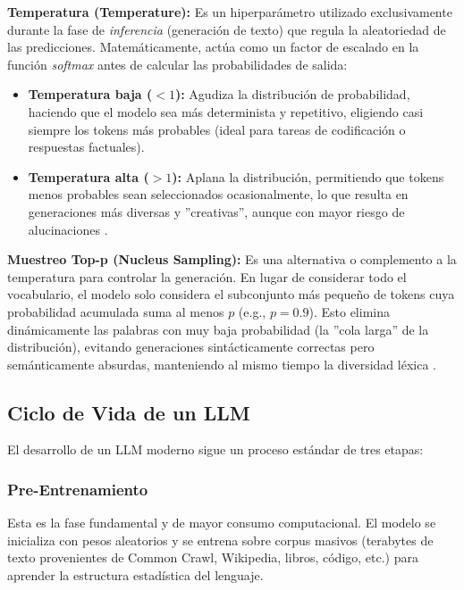 \documentclass[11pt, a4paper]{article}
\begin{document}
\begin{description}
    \item{\textbf{Temperatura (Temperature):}}
    Es un hiperparámetro utilizado exclusivamente durante la fase de \textit{inferencia} (generación de texto) que regula la aleatoriedad de las predicciones. Matemáticamente, actúa como un factor de escalado
    en la función \textit{softmax} antes de calcular las probabilidades de salida:
    \begin{itemize}
        \item \textbf{Temperatura baja ($< 1$):} Agudiza la distribución de probabilidad, haciendo que el modelo sea más determinista y repetitivo, eligiendo casi siempre los tokens más probables (ideal para
        tareas de codificación o respuestas factuales).
        \item \textbf{Temperatura alta ($> 1$):} Aplana la distribución, permitiendo que tokens menos probables sean seleccionados ocasionalmente, lo que resulta en generaciones más diversas y ''creativas'',
        aunque con mayor riesgo de alucinaciones \cite{atkinson2025, nvidia2023}.
    \end{itemize}

    \item{\textbf{Muestreo Top-p (Nucleus Sampling):}}
    Es una alternativa o complemento a la temperatura para controlar la generación. En lugar de considerar todo el vocabulario, el modelo solo considera el subconjunto más pequeño de tokens cuya probabilidad
    acumulada suma al menos $p$ (e.g., $p=0.9$). Esto elimina dinámicamente las palabras con muy baja probabilidad (la ''cola larga'' de la distribución), evitando generaciones sintácticamente correctas pero
    semánticamente absurdas, manteniendo al mismo tiempo la diversidad léxica \cite{atkinson2025}.
\end{description}

\subsection{Ciclo de Vida de un LLM}

El desarrollo de un LLM moderno sigue un proceso estándar de tres etapas:

\subsubsection{Pre-Entrenamiento}
Esta es la fase fundamental y de mayor consumo computacional. El modelo se inicializa con pesos aleatorios y se entrena sobre corpus masivos (terabytes de texto provenientes de Common Crawl, Wikipedia, libros,
código, etc.) para aprender la estructura estadística del lenguaje.
\end{document}
